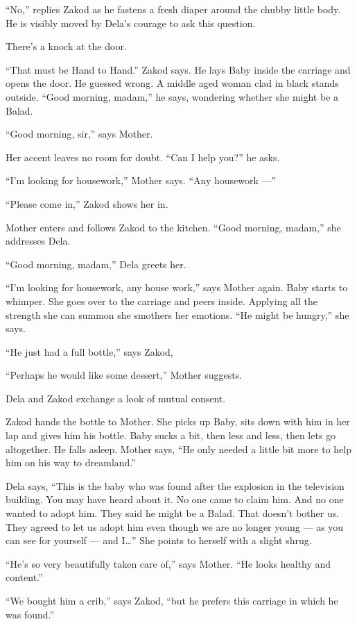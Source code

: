 \documentclass[twoside,11pt,openany]{book}
\begin{document}
``No,'' replies Zakod as he fastens a fresh diaper around the chubby little body. He is
visibly moved by Dela's courage to ask this question.

There's a knock at the door.

``That must be Hand to Hand.'' Zakod says. He lays Baby inside the carriage  and opens the door. He
guessed wrong. A middle aged woman clad in black stands outside.
``Good morning, madam,'' he says, wondering whether she might be a Balad.

``Good morning, sir,'' says Mother.

Her accent leaves no room for doubt. ``Can I help you?'' he asks.

``I'm looking for housework,'' Mother says. ``Any housework ---''

``Please come in,'' Zakod shows her in.

Mother enters and follows Zakod to the kitchen. ``Good morning, madam,'' she addresses Dela.

``Good morning,  madam,'' Dela greets her.

``I'm looking for housework, any house work,'' says Mother again.  Baby starts to whimper.
She goes over to the carriage and peers inside. Applying all the strength she can summon she smothers her emotions.
``He might be hungry,'' she says.

``He just had a full bottle,'' says Zakod,

``Perhaps he would like some dessert,'' Mother suggests.

Dela and Zakod exchange a look of mutual consent.

Zakod hands the bottle to Mother. She picks up Baby, sits down with him in her lap and gives him his bottle. Baby sucks
a bit, then less and less, then lets go altogether. He falls asleep. Mother says, ``He only needed a
little bit more to help him on his way to dreamland.''

Dela says, ``This is the baby who was found after the explosion in the television building. You may have
heard about it. No one came to claim him. And no one wanted to adopt him. They said he might be a Balad. That doesn't
bother us. They agreed to let us adopt him even though we are no longer young --- as you can see for yourself --- and I{\ldots}'' She points to herself with a slight shrug.

``He's so very beautifully taken care of,'' says Mother. ``He looks healthy and
content.''

``We bought him a crib,'' says Zakod, ``but he prefers this carriage in which he
was found.''
\end{document}
